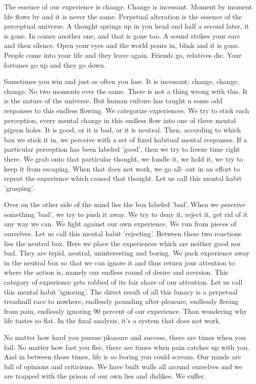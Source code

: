 The essence of our experience is change. Change is incessant. Moment by moment
life flows by and it is never the same. Perpetual alteration is the essence of
the perceptual universe. A thought springs up in you head and half a second
later, it is gone. In comes another one, and that is gone too. A sound strikes
your ears and then silence. Open your eyes and the world pours in, blink and it
is gone. People come into your life and they leave again. Friends go, relatives
die. Your fortunes go up and they go down.

Sometimes you win and just as often you lose. It is incessant: change, change,
change. No two moments ever the same.
There is not a thing wrong with this. It is the nature of the universe. But human culture has taught u some odd responses to this
endless flowing. We categorize experiences. We try to stick each perception, every mental change in this endless flow into one of
three mental pigeon holes. It is good, or it is bad, or it is neutral. Then, according to which box we stick it in, we perceive with a
set of fixed habitual mental responses. If a particular perception has been labeled 'good', then we try to freeze time right there. We
grab onto that particular thought, we fondle it, we hold it, we try to keep it from escaping. When that does not work, we go all-
out in an effort to repeat the experience which caused that thought. Let us call this mental habit 'grasping'.

Over on the other side of the mind lies the box labeled 'bad'. When we perceive
something 'bad', we try to push it away. We try to deny it, reject it, get rid
of it any way we can. We fight against our own experience. We run from pieces of
ourselves. Let us call this mental habit 'rejecting'. Between these two
reactions lies the neutral box. Here we place the experiences which are neither
good nor bad. They are tepid, neutral, uninteresting and boring. We pack
experience away in the neutral box so that we can ignore it and thus return jour
attention to where the action is, namely our endless round of desire and
aversion. This category of experience gets robbed of its fair share of our
attention. Let us call this mental habit 'ignoring'. The direct result of all
this lunacy is a perpetual treadmill race to nowhere, endlessly pounding after
pleasure, endlessly fleeing from pain, endlessly ignoring 90 percent of our
experience. Than wondering why life tastes so flat. In the final analysis, it's
a system that does not work.

No matter how hard you pursue pleasure and success, there are times when you
fail. No matter how fast you flee, there are times when pain catches up with
you. And in between those times, life is so boring you could scream. Our minds
are full of opinions and criticisms. We have built walls all around ourselves
and we are trapped with the prison of our own lies and dislikes. We suffer.

